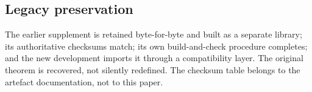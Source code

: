 \subsection{Legacy preservation}
The earlier supplement is retained byte-for-byte and built as a separate library; its authoritative checksums match; its own build-and-check procedure completes; and the new development imports it through a compatibility layer. The original theorem is recovered, not silently redefined. The checksum table belongs to the artefact documentation, not to this paper.
